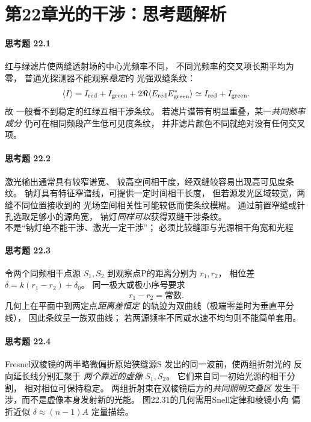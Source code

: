 \section*{第22章\quad 光的干涉：思考题解析}
\paragraph{思考题 22.1}
红与绿滤片使两缝透射场的中心光频率不同，
不同光频率的交叉项长期平均为零，
普通光探测器不能观察\emph{稳定}的
光强双缝条纹：
\[
\langle I\rangle=I_{\rm red}+I_{\rm green}
+2\Re\langle E_{\rm red}E_{\rm green}^*\rangle
\simeq I_{\rm red}+I_{\rm green}.
\]
故
\(\boxed{\text{一般看不到稳定的红绿互相干涉条纹}}\)。
若滤片谱带有明显重叠，某一\emph{共同频率成分}
仍可在相同频段产生低可见度条纹，
并非滤片颜色不同就绝对没有任何交叉项。

\paragraph{思考题 22.2}
激光输出通常具有较窄谱宽、
较高空间相干度，经双缝较容易出现高可见度条纹。
钠灯具有特征窄谱线，可提供一定时间相干长度，
但若源发光区域较宽，两缝不同位置接收到的
光场空间相关性可能较低而使条纹模糊。
通过前置窄缝或针孔选取足够小的源角宽，
钠灯\emph{同样可以}获得双缝干涉条纹。
\[
\boxed{\text{不是“钠灯绝不能干涉、激光一定干涉”；
必须比较缝距与光源相干角宽和光程差。}}
\]

\paragraph{思考题 22.3}
令两个同频相干点源 \(S_1,S_2\)
到观察点P的距离分别为 \(r_1,r_2\)，
相位差
\(\delta=k(r_1-r_2)+\delta_0\)。
同一极大或极小序号要求
\[
\boxed{r_1-r_2=\text{常数}}.
\]
几何上在平面中到两定点\emph{距离差恒定}
的轨迹为双曲线（极端零差时为垂直平分线），
因此条纹呈一族双曲线；
若两源频率不同或水速不均匀则不能简单套用。

\paragraph{思考题 22.4}
Fresnel双棱镜的两半略微偏折原始狭缝源S
发出的同一波前，使两组折射光的
反向延长线分别汇聚于
\emph{两个靠近的虚像} \(S_1,S_2\)。
它们来自同一初始光源的相干分割，
相对相位可保持稳定。
两组折射束在双棱镜后方的\emph{共同照明交叠区}
发生干涉，而不是虚像本身发射新的光能。
图22.31的几何需用Snell定律和棱镜小角
偏折近似 \(\delta\approx(n-1)A\) 定量描绘。

